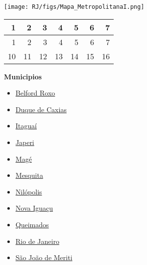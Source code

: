 \documentclass[10pt]{article} %
\begin{document}

\begin{minipage}[t]{.66\linewidth}
\hypertarget{ MtrI }{}
\texttt{[image: RJ/figs/Mapa\_MetropolitanaI.png]}\vspace{0.5cm}\begin{center}
\begin{tabular}{rrrrrrr}
  \hline
1 & 2 & 3 & 4 & 5 & 6 & 7 \\ 
  \hline
  1 &   2 &   3 &   4 &   5 &   6 &   7 \\ 
   10 &  11 &  12 &  13 &  14 &  15 &  16 \\ 
   \hline
\end{tabular}
\end{center}
\end{minipage}\hfill\begin{minipage}[t]{.30\linewidth}
\begin{mdframed}[style=sidebar,frametitle={}]
\textbf{Municipios}\begin{itemize}\item \hyperlink{https:/alerta.dengue.mat.br/alerta/3300456}{Belford Roxo}
\item \hyperlink{https:/alerta.dengue.mat.br/alerta/3301702}{Duque de Caxias}
\item \hyperlink{https:/alerta.dengue.mat.br/alerta/3302007}{Itaguaí}
\item \hyperlink{https:/alerta.dengue.mat.br/alerta/3302270}{Japeri}
\item \hyperlink{https:/alerta.dengue.mat.br/alerta/3302502}{Magé}
\item \hyperlink{https:/alerta.dengue.mat.br/alerta/3302858}{Mesquita}
\item \hyperlink{https:/alerta.dengue.mat.br/alerta/3303203}{Nilópolis}
\item \hyperlink{https:/alerta.dengue.mat.br/alerta/3303500}{Nova Iguaçu}
\item \hyperlink{https:/alerta.dengue.mat.br/alerta/3304144}{Queimados}
\item \hyperlink{https:/alerta.dengue.mat.br/alerta/3304557}{Rio de Janeiro}
\item \hyperlink{https:/alerta.dengue.mat.br/alerta/3305109}{São João de Meriti}

\end{itemize}
\end{mdframed}
\end{minipage}
\end{document}
